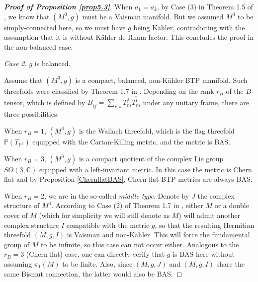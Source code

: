 \documentclass{amsart}
\numberwithin{equation}{section}
\theoremstyle{definition}
\renewcommand{\1}{\mathds{1}}
\renewcommand{\>}{\rightarrow}
\begin{document}
\begin{proof}[{\bf Proof of Proposition \ref{prop5.3}}]
When $a_1=a_2$, by Case (3) in Theorem 1.5 of \cite{ZhaoZ22}, we know that $(M^3,g)$ must be a Vaisman manifold. But we assumed $M^3$ to be simply-connected here, so we must have $g$ being K\"ahler, contradicting with the assumption that it is without K\"ahler de Rham factor. This concludes the proof in the non-balanced case.

{\em Case 2.} $g$ is balanced.

Assume that $(M^3,g)$ is a compact, balanced, non-K\"ahler {\rm BTP} manifold. Such threefolds were classified by Theorem 1.7 in \cite{ZhaoZ22}. Depending on the rank $r_B$ of the $B$-tensor, which is defined by $B_{i\bar{j}} =\sum_{r,s} T^j_{rs} \overline{T^i_{rs} } $ under any unitary frame, there are three possibilities.

When $r_B=1$, $(M^3,g)$ is the Wallach threefold, which is the flag threefold ${\mathbb P}(T_{{\mathbb P}^2})$ equipped with the Cartan-Killing metric, and the metric is {\rm BAS}.

When $r_B=3$, $(M^3,g)$ is a compact quotient of the complex Lie group $SO(3,{\mathbb C})$ equipped with a left-invariant metric. In this case the metric is Chern flat and by  Proposition \ref{ChernflatBAS}, Chern flat {\rm BTP} metrics are always {\rm BAS}.

When $r_B=2$, we are in the so-called {\em middle type}. Denote by $J$ the complex structure of $M^3$. According to Case (2) of Theorem 1.7 in \cite{ZhaoZ22}, either $M$ or a double cover of $M$ (which for simplicity we will still denote as $M$) will admit another complex structure $I$ compatible with the metric $g$, so that the resulting Hermitian threefold $(M,g,I)$ is Vaisman and non-K\"ahler. This will force the fundamental group of $M$ to be infinite, so this case can not occur either. Analogous to the $r_B=3$ (Chern flat) case, one can directly verify that $g$ is {\rm BAS} here without assuming $\pi_1(M)$ to be finite. Also, since $(M,g,J)$ and $(M,g,I)$ share the same Bismut connection, the latter would also be {\rm BAS}.


\end{proof}
\end{document}
